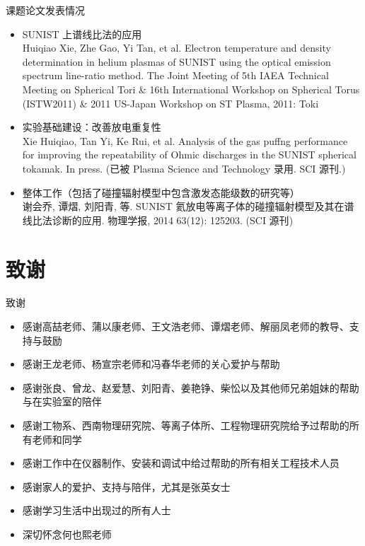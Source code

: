 \begin{CJK*}{UTF8}{kai}
\begin{frame}{课题论文发表情况}
	\small{
	\begin{itemize}
		\item SUNIST 上谱线比法的应用\\
			{\tiny Huiqiao Xie, Zhe Gao, Yi Tan, et al. Electron temperature and density determination in helium plasmas of SUNIST using the optical emission spectrum line-ratio method. The Joint Meeting of 5th IAEA Technical Meeting on Spherical Tori \& 16th International Workshop on Spherical Torus (\alert{ISTW2011}) \& 2011 US-Japan Workshop on ST Plasma, 2011: Toki}
		\item 实验基础建设：改善放电重复性\\
			{\tiny Xie Huiqiao, Tan Yi, Ke Rui, et al. Analysis of the gas puffng performance for improving the repeatability of Ohmic discharges in the SUNIST spherical tokamak. In press. (\alert{已被 Plasma Science and Technology 录用. SCI 源刊.})}
		\item 整体工作（包括了碰撞辐射模型中包含激发态能级数的研究等）\\
			{\tiny 谢会乔, 谭熠, 刘阳青, 等. SUNIST 氦放电等离子体的碰撞辐射模型及其在谱线比法诊断的应用. 物理学报, 2014 63(12): 125203. (\alert{SCI 源刊})} %
	\end{itemize}
	}
\end{frame}

\section{致谢}
\begin{frame}{致谢}
	\begin{itemize}
		\item 感谢高喆老师、蒲以康老师、王文浩老师、谭熠老师、解丽凤老师的教导、支持与鼓励
		\item 感谢王龙老师、杨宣宗老师和冯春华老师的关心爱护与帮助
		\item 感谢张良、曾龙、赵爱慧、刘阳青、姜艳铮、柴忪以及其他师兄弟姐妹的帮助与在实验室的陪伴
		\item 感谢工物系、西南物理研究院、等离子体所、工程物理研究院给予过帮助的所有老师和同学
		\item 感谢工作中在仪器制作、安装和调试中给过帮助的所有相关工程技术人员
		\item 感谢家人的爱护、支持与陪伴，尤其是张英女士
		\item 感谢学习生活中出现过的所有人士
		\item 深切怀念何也熙老师
	\end{itemize}
\end{frame}
\appendix


\end{CJK*}
